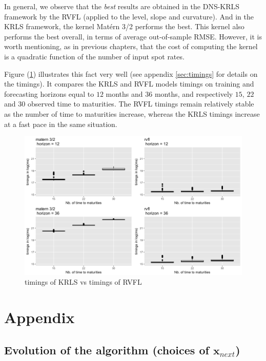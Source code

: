 In general, we observe that the \textit{best} results are obtained in the DNS-KRLS framework by the RVFL (applied to the level, slope and curvature). And in the KRLS framework, the kernel Mat\'ern 3/2 performs the best. This kernel also performs the best overall, in terms of average out-of-sample RMSE. However, it is worth mentioning, as in previous chapters, that the cost of computing the kernel is a quadratic function of the number of input spot rates. 

Figure (\ref{timings}) illustrates this fact very well (see appendix \ref{sec:timings} for details on the timings). It compares the KRLS and RVFL models timings on training and forecasting horizons equal to $12$ months and $36$ months, and respectively $15$, $22$ and $30$ observed time to maturities. The RVFL timings remain relatively stable as the number of time to maturities increase, whereas the KRLS timings increase at a fast pace in the same situation.

\begin{figure}[!htb]
\centering
\includegraphics[width=14cm]{gfx/chapter-bayesianrvfl/timings.png}
\caption{timings of KRLS vs timings of RVFL}
\label{timings}
\end{figure}

\newpage

\section{Appendix}

\subsection{Evolution of the algorithm (choices of $\textbf{x}_{next}$)}
\label{sec:chosen_points}


